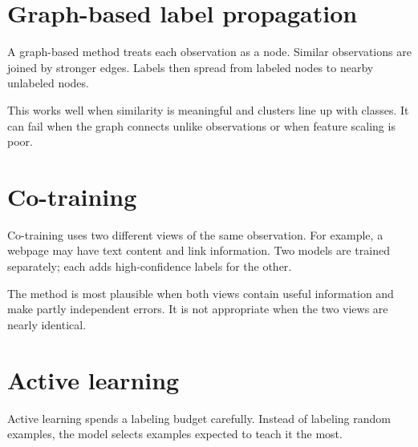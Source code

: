 \section{Graph-based label propagation}

A graph-based method treats each observation as a node. Similar observations are joined by stronger edges. Labels then spread from labeled nodes to nearby unlabeled nodes.

\begin{mlfigure}
\end{mlfigure}

This works well when similarity is meaningful and clusters line up with classes. It can fail when the graph connects unlike observations or when feature scaling is poor.

\section{Co-training}

Co-training uses two different views of the same observation. For example, a webpage may have text content and link information. Two models are trained separately; each adds high-confidence labels for the other.

The method is most plausible when both views contain useful information and make partly independent errors. It is not appropriate when the two views are nearly identical.

\section{Active learning}

Active learning spends a labeling budget carefully. Instead of labeling random examples, the model selects examples expected to teach it the most.

